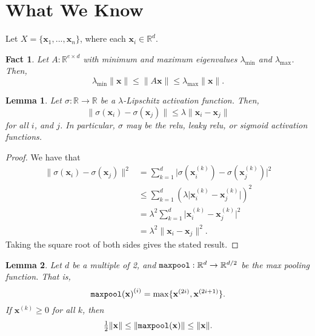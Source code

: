 \documentclass{article}
\newtheorem{lemma}{Lemma}
\newtheorem{fact}{Fact}
\newcommand{\R}{\mathbb{R}}
\newcommand{\abs}[1]{\lvert{#1}\rvert}
\newcommand{\ltwo}[1]{\lVert {#1} \rVert}
\newcommand{\x}{\mathbf x}
\newcommand{\emin}{\lambda_{\text{min}}}
\newcommand{\emax}{\lambda_{\text{max}}}
\DeclareMathOperator{\maxpool}{\textup{\texttt{maxpool}}}
\begin{document}

\section{What We Know}

Let $X=\{\x_1,...,\x_n\}$, where each $\x_i\in\R^d$.

\newcommand{\elem}[2]{{#2}^{(#1)}}

\begin{fact}
    Let $A : \R^{e\times d}$ with minimum and maximum eigenvalues $\emin$ and $\emax$.
    Then,
    \begin{equation}
        \emin\ltwo{\x} \le \ltwo{A\x} \le \emax\ltwo{\x}.
    \end{equation}
\end{fact}

\begin{lemma}
    Let $\sigma:\R\to\R$ be a $\lambda$-Lipschitz activation function.
    Then,
    \begin{equation}
        \ltwo{\sigma(\x_i)-\sigma(\x_j)}
        \le
        \lambda\ltwo{\x_i-\x_j} 
    \end{equation}
    for all $i$, and $j$.
    In particular, $\sigma$ may be the relu, leaky relu, or sigmoid activation functions.
\end{lemma}

\begin{proof}
    We have that
    \begin{align}
        \ltwo{\sigma(\x_i) - \sigma(\x_j)}^2 
        &=
        \sum_{k=1}^d \abs{\sigma(\elem k\x_i) - \sigma(\elem k\x_j)}^2
        \\&\le
        \sum_{k=1}^d (\lambda\abs{\elem k\x_i - \elem k\x_j})^2
        \\&=
        \lambda^2\sum_{k=1}^d \abs{\elem k\x_i - \elem k\x_j}^2
        \\&= 
        \lambda^2\ltwo{\x_i - \x_j}^2 
        .
    \end{align}
    Taking the square root of both sides gives the stated result.
\end{proof}

\begin{lemma}
    Let $d$ be a multiple of 2, and $\maxpool : \R^d \to \R^{d/2}$ be the max pooling function.
    That is,
    \begin{equation}
        \elem{i}{\maxpool(\x)} = \max\{\elem{2i}\x,\elem{2i+1}\x\}
        .
    \end{equation}
    If $\elem k\x\ge0$ for all $k$, then
    \begin{equation}
        \tfrac12\ltwo{\x} \le \ltwo{\maxpool(\x)} \le \ltwo{\x}.
    \end{equation}
\end{lemma}
\end{document}
